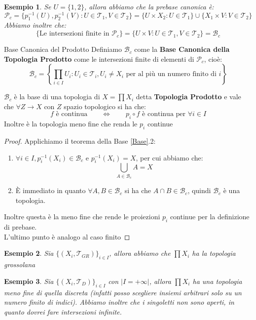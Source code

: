 \documentclass[11pt,a4paper,twoside]{article}
\newtheorem{es}{Esempio}
\theoremstyle{definition}
\begin{document}
\begin{es}
	Se $U = \{1,2\}$, allora abbiamo che la prebase canonica è:
	\[ \mathcal P_c = \{ p_1^{-1}(U), p_2^{-1}(V): U \in \mathcal T_1, V \in \mathcal T_2 \} = \{ U \times X_2:U \in \mathcal T_1 \} \cup \{ X_1 \times V:V \in \mathcal T_2\}\]
	Abbiamo inoltre che:
	\[ \{ \text{Le intersezioni finite in }\mathcal P_c \}= \{U \times V: U \in \mathcal T_1, V \in \mathcal T_2\} = \mathcal B_c \]
\end{es}

\begin{defn}{Base Canonica del Prodotto}{}{}
	Definiamo $\mathcal B_c$ come la \textbf{Base Canonica della Topologia Prodotto} come le intersezioni finite di elementi di $\mathcal P_c$, cioè:
	\[ \mathcal B_c = \left\{ \prod_{i \in I} U_i: U_i \in \mathcal T_i, U_i \neq X_i \text{ per al più un numero finito di }i \right\} \]
\end{defn}

\begin{prop}{}{}
	$\mathcal B_c$ è la base di una topologia di $X = \prod X_i$ detta \textbf{Topologia Prodotto} e vale che $\forall Z \to X$ con $Z$ spazio topologico si ha che:
	\[ f \text{ è continua}\qquad \Leftrightarrow \qquad p_i \circ f \text{ è continua per }\forall i \in I \]
	Inoltre è la topologia meno fine che renda le $p_i$ continue
\end{prop}

\begin{proof}
	Applichiamo il teorema della Base \ref{Base}.2:
	\begin{enumerate}
		\item $\forall i \in I, p_i^{-1}(X_i) \in \mathcal B_c$ e $p_i^{-1}(X_i) = X$, per cui abbiamo che:
		\[ \bigcup_{A \in \mathcal B_c}A = X \]
		\item È immediato in quanto $\forall A,B \in \mathcal B_c$ si ha che $A \cap B \in \mathcal B_c$, quindi $\mathcal B_c$ è una topologia.
	\end{enumerate}
	Inoltre questa è la meno fine che rende le proiezioni $p_i$ continue per la definizione di prebase.\\
	L'ultimo punto è analogo al caso finito
\end{proof}

\begin{es}
	Sia $\{(X_i, \mathcal T_{GR})\}_{i \in I}$, allora abbiamo che $\prod X_i$ ha la topologia grossolana
\end{es}

\begin{es}
	Sia $\{(X_i, \mathcal T_D)\}_{i \in I}$ con $|I = + \infty|$, allora $\prod X_i$ ha una topologia meno fine di quella discreta (infatti posso scegliere insiemi arbitrari solo su un numero finito di indici). Abbiamo inoltre che i singoletti non sono aperti, in quanto dovrei fare intersezioni infinite.
\end{es}
\end{document}
